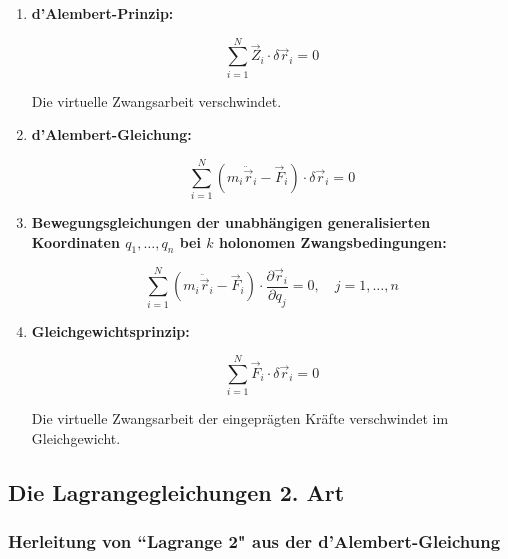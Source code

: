 \documentclass[10pt, letterpaper]{article}
\begin{document}
\begin{enumerate}
    \item \textbf{d'Alembert-Prinzip:}
    
    $$
    \sum_{i=1}^N \vec{Z}_i \cdot \delta\vec{r}_i = 0
    $$
    
    Die virtuelle Zwangsarbeit verschwindet.

    \item \textbf{d'Alembert-Gleichung:}
    
    $$
    \sum_{i=1}^N (m_i \ddot{\vec{r}}_i - \vec{F}_i) \cdot \delta\vec{r}_i = 0
    $$

    \item \textbf{Bewegungsgleichungen der unabhängigen generalisierten Koordinaten \( q_1, \dots, q_n \) bei \( k \) holonomen Zwangsbedingungen:}
    
    $$
    \sum_{i=1}^N (m_i \ddot{\vec{r}}_i - \vec{F}_i) \cdot \frac{\partial\vec{r}_i}{\partial q_j} = 0,
    \quad j = 1, \dots, n
    $$

    \item \textbf{Gleichgewichtsprinzip:}
    
    $$
    \sum_{i=1}^N \vec{F}_i \cdot \delta\vec{r}_i = 0
    $$

    Die virtuelle Zwangsarbeit der eingeprägten Kräfte verschwindet im Gleichgewicht.
\end{enumerate}











\pagebreak


\subsection{Die Lagrangegleichungen 2. Art}


\subsubsection{Herleitung von ``Lagrange 2" aus der d'Alembert-Gleichung}


\end{document}
